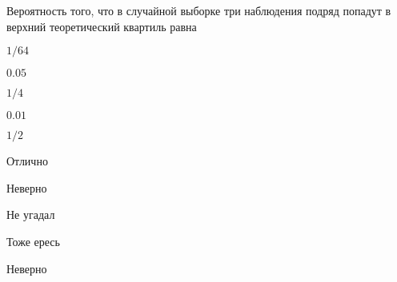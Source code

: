 
\begin{question}
Вероятность того, что в случайной выборке три наблюдения подряд попадут
в верхний теоретический квартиль равна
\begin{answerlist}
  \item \(1/64\)
  \item \(0.05\)
  \item \(1/4\)
  \item \(0.01\)
  \item \(1/2\)
\end{answerlist}
\end{question}

\begin{solution}
\begin{answerlist}
  \item Отлично
  \item Неверно
  \item Не угадал
  \item Тоже ересь
  \item Неверно
\end{answerlist}
\end{solution}


